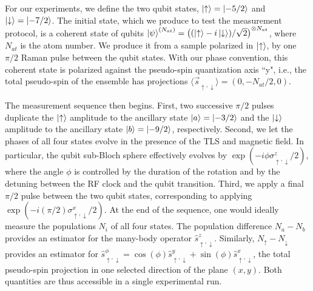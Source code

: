 For our experiments, we define the two qubit states, $\ket{\uparrow} = \ket{-5/2}$ and $\ket{\downarrow} = \ket{-7/2}$. The initial state, which we produce to test the measurement protocol, is a coherent state of qubits $\ket{\psi}^{(N_{at})} = \left( (\ket{\uparrow} - i \ket{\downarrow})/\sqrt{2}\right)^{\otimes N_{at}}$, where $N_{at}$ is the atom number. We produce it from a sample polarized in $\ket{\uparrow}$, by one $\pi/2$ Raman pulse between the qubit states. With our phase convention, this coherent state is polarized against the pseudo-spin quantization axis ``y", i.e., the total pseudo-spin of the ensemble has projections $\langle \vec s_{\uparrow, \downarrow} \rangle  = (0, - N_{at}/2, 0)$.

The measurement sequence then begins. First, two successive $\pi/2$ pulses duplicate the $\ket{\uparrow}$ amplitude to the ancillary state $\ket{a} = \ket{-3/2}$ and the $\ket{\downarrow}$ amplitude to the ancillary state $\ket{b} = \ket{-9/2}$, respectively. Second, we let the phases of all four states evolve in the presence of the TLS and magnetic field. In particular, the qubit sub-Bloch sphere effectively evolves by $\exp{\left( - i \phi \sigma^z_{\uparrow, \downarrow} /2\right)}$, where the angle $\phi$ is controlled by the duration of the rotation and by the detuning between the RF clock and the qubit transition. Third, we apply a final $\pi/2$ pulse between the two qubit states, corresponding to applying $\exp{\left( - i (\pi/2) \sigma^x_{\uparrow, \downarrow} /2\right)}$. At the end of the sequence, one would ideally measure the populations $N_i$ of all four states. The population difference $N_{a}-N_{b}$ provides an estimator for the many-body operator $\hat{s}^z_{\uparrow, \downarrow}$. 
Similarly, $N_{\uparrow}-N_{\downarrow}$ provides an estimator for $\hat{s}^\phi_{\uparrow,\downarrow} = \cos(\phi) \hat{s}^y_{\uparrow, \downarrow} + \sin(\phi) \hat{s}^x_{\uparrow, \downarrow}$, the total pseudo-spin projection in one selected direction of the plane $(x,y)$. 
Both quantities are thus accessible in a single experimental run. 

